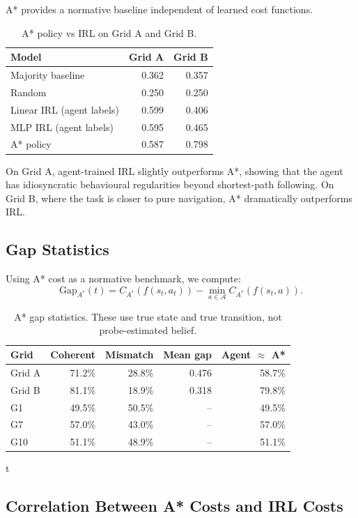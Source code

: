 \documentclass[11pt,a4paper]{article}
\newcommand{\A}{\mathcal{A}}
\begin{document}
A* provides a normative baseline independent of learned cost functions.

\begin{table}[h]
\centering
\begin{tabular}{lrr}
\toprule
Model & Grid A & Grid B \\
\midrule
Majority baseline & 0.362 & 0.357 \\
Random & 0.250 & 0.250 \\
Linear IRL (agent labels) & 0.599 & 0.406 \\
MLP IRL (agent labels) & 0.595 & 0.465 \\
A* policy & 0.587 & 0.798 \\
\bottomrule
\end{tabular}
\caption{A* policy vs IRL on Grid A and Grid B.}
\label{tab:astar-vs-irl}
\end{table}

On Grid A, agent-trained IRL slightly outperforms A*, showing that the agent has idiosyncratic behavioural regularities beyond shortest-path following. On Grid B, where the task is closer to pure navigation, A* dramatically outperforms IRL.

\subsection{Gap Statistics}

Using A* cost as a normative benchmark, we compute:
\[
\mathrm{Gap}_{A^*}(t)=C_{A^*}(f(s_t,a_t))-\min_{a\in\A}C_{A^*}(f(s_t,a)).
\]

\begin{table}[h]
\centering
\begin{tabular}{lrrrr}
\toprule
Grid & Coherent & Mismatch & Mean gap & Agent $\approx$ A* \\
\midrule
Grid A & 71.2\% & 28.8\% & 0.476 & 58.7\% \\
Grid B & 81.1\% & 18.9\% & 0.318 & 79.8\% \\
G1 & 49.5\% & 50.5\% & -- & 49.5\% \\
G7 & 57.0\% & 43.0\% & -- & 57.0\% \\
G10 & 51.1\% & 48.9\% & -- & 51.1\% \\
\bottomrule
\end{tabular}
\caption{A* gap statistics. These use true state and true transition, not probe-estimated belief.} t
\label{tab:gap-stats}
\end{table}

\subsection{Correlation Between A* Costs and IRL Costs}
\end{document}
